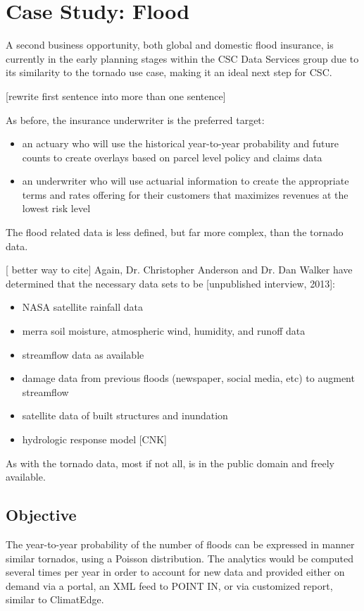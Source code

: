 \section{Case Study: Flood}
A second business opportunity, both global and domestic flood insurance, is currently in the early planning stages within the CSC Data Services group due to its similarity to the tornado use case, making it an ideal next step for CSC. 

[rewrite first sentence into more than one sentence]


 As before, the  insurance underwriter is the preferred target:
\begin{itemize}
    \item an actuary who will use the historical year-to-year probability and future counts to create overlays based on parcel level policy and claims data
    \item an underwriter who will use actuarial information to create the appropriate terms and rates offering for their customers that maximizes revenues at the lowest risk level
\end{itemize}
The flood related data is less defined, but far more complex, than the tornado data. 

[ better way to cite]
Again, Dr. Christopher Anderson and Dr. Dan Walker have determined that the necessary data sets to be [unpublished interview, 2013]:
\begin{itemize}
    \item NASA satellite rainfall data
    \item \gls{merra} soil moisture, atmospheric wind,  humidity, and runoff data
    \item streamflow data as available
    \item damage data from previous floods (newspaper, social media, etc) to augment streamflow
    \item satellite data of built structures and inundation
    \item hydrologic response model [CNK]
\end{itemize}
As with the tornado data, most if not all, is in the public domain and freely available.
\subsection{Objective}
The year-to-year probability of the number of floods can be expressed in manner similar tornados, using a Poisson distribution. The analytics would be computed several times per year in order to account for new data and provided either on demand via a portal, an XML feed to POINT IN, or via customized  report, similar to ClimatEdge\texttrademark{}.

